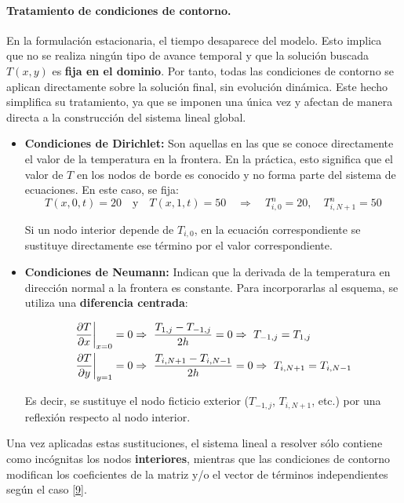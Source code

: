 \documentclass{article}
\begin{document}
\paragraph{Tratamiento de condiciones de contorno.} En la formulación estacionaria, el tiempo desaparece del modelo. Esto implica que no se realiza ningún tipo de avance temporal y que la solución buscada $T(x, y)$ es \textbf{fija en el dominio}. Por tanto, todas las condiciones de contorno se aplican directamente sobre la solución final, sin evolución dinámica. Este hecho simplifica su tratamiento, ya que se imponen una única vez y afectan de manera directa a la construcción del sistema lineal global.

\begin{itemize}
    \item \textbf{Condiciones de Dirichlet:} Son aquellas en las que se conoce directamente el valor de la temperatura en la frontera. En la práctica, esto significa que el valor de $T$ en los nodos de borde es conocido y no forma parte del sistema de ecuaciones. En este caso, se fija:
    $$
    T(x, 0, t) = 20 \quad \text{y} \quad T(x, 1, t) = 50 
    \quad \Longrightarrow \quad 
    T_{i,0}^n = 20, \quad T_{i,N+1}^n = 50
    $$

    Si un nodo interior depende de $T_{i,0}$, en la ecuación correspondiente se sustituye directamente ese término por el valor correspondiente.

    \item \textbf{Condiciones de Neumann:} Indican que la derivada de la temperatura en dirección normal a la frontera es constante. Para incorporarlas al esquema, se utiliza una \textbf{diferencia centrada}:

    \begin{align}
    \left. \frac{\partial T}{\partial x} \right|_{x=0} = 0 
    &\Rightarrow\ \frac{T_{1,j} - T_{-1,j}}{2h} = 0 
    \Rightarrow\ T_{-1,j} = T_{1,j} \notag \\
    \left. \frac{\partial T}{\partial y} \right|_{y=1} = 0 
    &\Rightarrow\ \frac{T_{i,N+1} - T_{i,N-1}}{2h} = 0 
    \Rightarrow\ T_{i,N+1} = T_{i,N-1} \notag
    \end{align}

    \noindent Es decir, se sustituye el nodo ficticio exterior ($T_{-1,j}$, $T_{i,N+1}$, etc.) por una reflexión respecto al nodo interior.
\end{itemize}
Una vez aplicadas estas sustituciones, el sistema lineal a resolver sólo contiene como incógnitas los nodos \textbf{interiores}, mientras que las condiciones de contorno modifican los coeficientes de la matriz y/o el vector de términos independientes según el caso [\href{https://riull.ull.es/xmlui/bitstream/handle/915/16290/Metodos%20numericos%20para%20la%20resolucion%20de%20ecuaciones%20diferenciales%20y%20aplicaciones..pdf?sequence=1&isAllowed=y}{9}].
\end{document}
